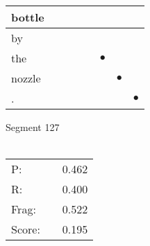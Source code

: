 \documentclass[landscape]{article}
\newcommand{\ssp}{\hspace{2pt}}
\newcommand{\mex}{\cellcolor{g}$\bullet$}
\begin{document}
\begin{tabular}{|l|p{10pt}|p{10pt}|p{10pt}|p{10pt}|p{10pt}|p{10pt}|p{10pt}|}
\hline
\ssp bottle \ssp&\hspace{2pt}&\hspace{2pt}&\hspace{2pt}&\hspace{2pt}&\hspace{2pt}&\hspace{2pt}&\hspace{2pt}\\
\hline
\ssp by \ssp&\hspace{2pt}&\hspace{2pt}&\hspace{2pt}&\hspace{2pt}&\hspace{2pt}&\hspace{2pt}&\hspace{2pt}\\
\hline
\ssp \cellcolor{ref4}the \ssp&\hspace{2pt}&\hspace{2pt}&\hspace{2pt}&\hspace{2pt}&\hspace{2pt}\mex&\hspace{2pt}&\hspace{2pt}\\
\hline
\ssp \cellcolor{ref5}nozzle \ssp&\hspace{2pt}&\hspace{2pt}&\hspace{2pt}&\hspace{2pt}&\hspace{2pt}&\hspace{2pt}\mex&\hspace{2pt}\\
\hline
\ssp \cellcolor{ref6}. \ssp&\hspace{2pt}&\hspace{2pt}&\hspace{2pt}&\hspace{2pt}&\hspace{2pt}&\hspace{2pt}&\hspace{2pt}\mex\\
\hline
\end{tabular}

\vspace{6pt}
\noindent Segment 127\\\\
\noindent\begin{tabular}{lm{12pt}r}
\hline
P:&&0.462\\
R:&&0.400\\
Frag:&&0.522\\
Score:&&0.195\\
\end{tabular}
\end{document}
